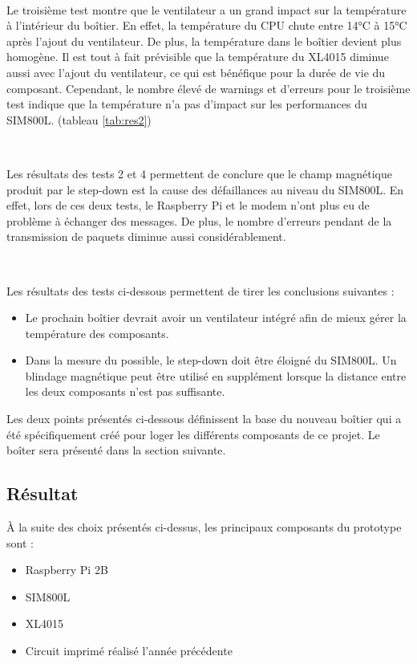 ~

\noindent
Le troisième test montre que le ventilateur a un grand impact sur la température à l’intérieur du boîtier. En effet, la température du CPU chute entre 14°C à 15°C après l’ajout du ventilateur. De plus, la température dans le boîtier devient plus homogène. Il est tout à fait prévisible que la température du XL4015 diminue aussi avec l’ajout du ventilateur, ce qui est bénéfique pour la durée de vie du composant. Cependant, le nombre élevé de warnings et d’erreurs pour le troisième test indique que la température n’a pas d’impact sur les performances du SIM800L. (tableau \ref{tab:res2})

~

\noindent
Les résultats des tests 2 et 4 permettent de conclure que le champ magnétique produit par le step-down est la cause des défaillances au niveau du SIM800L. En effet, lors de ces deux tests, le Raspberry Pi et le modem n’ont plus eu de problème à échanger des messages. De plus, le nombre d’erreurs pendant de la transmission de paquets diminue aussi considérablement.

~

\noindent
Les résultats des tests ci-dessous permettent de tirer les conclusions suivantes :

\begin{itemize}
  \item Le prochain boîtier devrait avoir un ventilateur intégré afin de mieux gérer la température des composants.
  \item Dans la mesure du possible, le step-down doit être éloigné du SIM800L. Un blindage magnétique peut être utilisé en supplément lorsque la distance entre les deux composants n’est pas suffisante.
\end{itemize}

\noindent
Les deux points présentés ci-dessous définissent la base du nouveau boîtier qui a été spécifiquement créé pour loger les différents composants de ce projet. Le boîter sera présenté dans la section suivante.


\subsection{Résultat}
\label{sec:protores}

À la suite des choix présentés ci-dessus, les principaux composants du prototype sont :

\begin{itemize}
  \item Raspberry Pi 2B
  \item SIM800L
  \item XL4015
  \item Circuit imprimé réalisé l’année précédente
\end{itemize}

